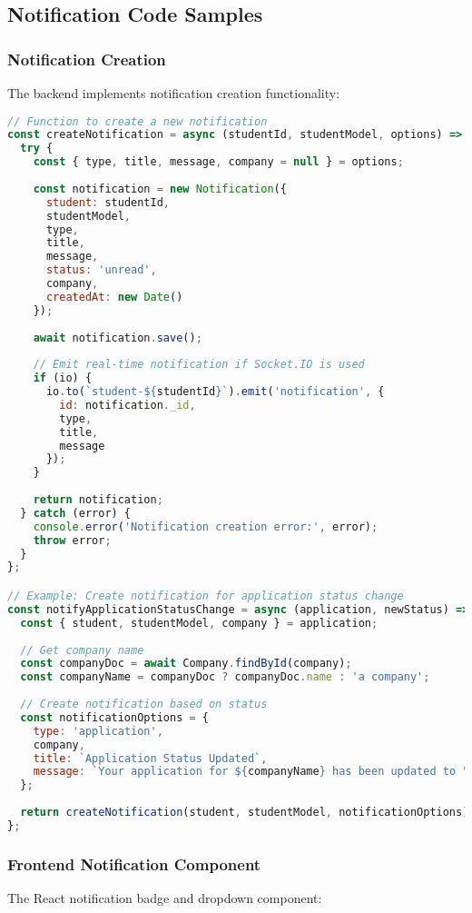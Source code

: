 \documentclass[12pt,a4paper]{report}
\begin{document}
\subsection{Notification Code Samples}

\subsubsection{Notification Creation}
The backend implements notification creation functionality:

\begin{lstlisting}[language=JavaScript, caption=Notification Creation Function]
// Function to create a new notification
const createNotification = async (studentId, studentModel, options) => {
  try {
    const { type, title, message, company = null } = options;
    
    const notification = new Notification({
      student: studentId,
      studentModel,
      type,
      title,
      message,
      status: 'unread',
      company,
      createdAt: new Date()
    });
    
    await notification.save();
    
    // Emit real-time notification if Socket.IO is used
    if (io) {
      io.to(`student-${studentId}`).emit('notification', {
        id: notification._id,
        type,
        title,
        message
      });
    }
    
    return notification;
  } catch (error) {
    console.error('Notification creation error:', error);
    throw error;
  }
};

// Example: Create notification for application status change
const notifyApplicationStatusChange = async (application, newStatus) => {
  const { student, studentModel, company } = application;
  
  // Get company name
  const companyDoc = await Company.findById(company);
  const companyName = companyDoc ? companyDoc.name : 'a company';
  
  // Create notification based on status
  const notificationOptions = {
    type: 'application',
    company,
    title: `Application Status Updated`,
    message: `Your application for ${companyName} has been updated to "${newStatus}"`
  };
  
  return createNotification(student, studentModel, notificationOptions);
};
\end{lstlisting}

\subsubsection{Frontend Notification Component}
The React notification badge and dropdown component:
\end{document}
